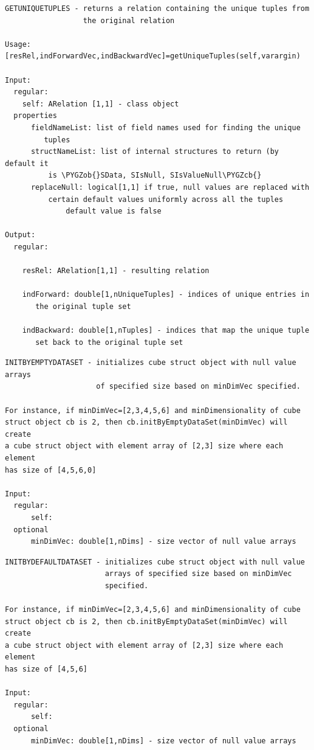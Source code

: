\documentclass[letterpaper,10pt,english]{sphinxmanual}
\def\PYGZob{\char`\{}
\def\PYGZcb{\char`\}}
\begin{document}
\begin{Verbatim}[commandchars=\\\{\}]
GETUNIQUETUPLES - returns a relation containing the unique tuples from
                  the original relation

Usage: [resRel,indForwardVec,indBackwardVec]=getUniqueTuples(self,varargin)

Input:
  regular:
    self: ARelation [1,1] - class object
  properties
      fieldNameList: list of field names used for finding the unique
         tuples
      structNameList: list of internal structures to return (by default it
          is \PYGZob{}SData, SIsNull, SIsValueNull\PYGZcb{}
      replaceNull: logical[1,1] if true, null values are replaced with
          certain default values uniformly across all the tuples
              default value is false

Output:
  regular:

    resRel: ARelation[1,1] - resulting relation

    indForward: double[1,nUniqueTuples] - indices of unique entries in
       the original tuple set

    indBackward: double[1,nTuples] - indices that map the unique tuple
       set back to the original tuple set
\end{Verbatim}

\begin{Verbatim}[commandchars=\\\{\}]
INITBYEMPTYDATASET - initializes cube struct object with null value arrays
                     of specified size based on minDimVec specified.

For instance, if minDimVec=[2,3,4,5,6] and minDimensionality of cube
struct object cb is 2, then cb.initByEmptyDataSet(minDimVec) will create
a cube struct object with element array of [2,3] size where each element
has size of [4,5,6,0]

Input:
  regular:
      self:
  optional
      minDimVec: double[1,nDims] - size vector of null value arrays
\end{Verbatim}

\begin{Verbatim}[commandchars=\\\{\}]
INITBYDEFAULTDATASET - initializes cube struct object with null value
                       arrays of specified size based on minDimVec
                       specified.

For instance, if minDimVec=[2,3,4,5,6] and minDimensionality of cube
struct object cb is 2, then cb.initByEmptyDataSet(minDimVec) will create
a cube struct object with element array of [2,3] size where each element
has size of [4,5,6]

Input:
  regular:
      self:
  optional
      minDimVec: double[1,nDims] - size vector of null value arrays
\end{Verbatim}
\end{document}
